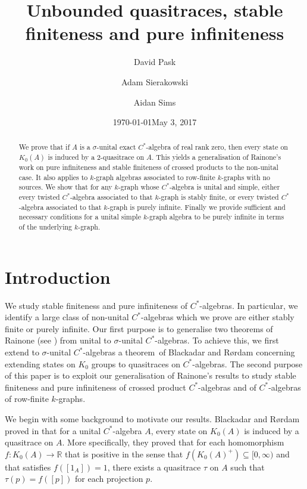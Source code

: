 \documentclass[a4paper, 12pt]{amsart}
\date{\today}
\author{David Pask}
\author{Adam Sierakowski}
\author{Aidan Sims}
\title[Quasitraces]{Unbounded quasitraces, stable finiteness and pure infiniteness}
\date{May 3, 2017}
\numberwithin{equation}{section}
\newcounter{theorem}
\theoremstyle{remark}
\theoremstyle{definition}
\begin{document}
\begin{abstract}
We prove that if $A$ is a $\sigma$-unital exact $C^*$-algebra of real rank zero, then
every state on $K_0(A)$ is induced by a 2-quasitrace on $A$. This yields a generalisation
of Rainone's work on pure infiniteness and stable finiteness of crossed products to the
non-unital case. It also applies to $k$-graph algebras associated to row-finite
$k$-graphs with no sources. We show that for any $k$-graph whose $C^*$-algebra is unital
and simple, either every twisted $C^*$-algebra associated to that $k$-graph is stably
finite, or every twisted $C^*$-algebra associated to that $k$-graph is purely infinite.
Finally we provide sufficient and necessary conditions for a unital simple $k$-graph
algebra to be purely infinite in terms of the underlying $k$-graph.
\end{abstract}

\maketitle

\tableofcontents

\section*{Introduction}
We study stable finiteness and pure infiniteness of $C^*$-algebras. In particular, we
identify a large class of non-unital $C^*$-algebras which we prove are either stably
finite or purely infinite. Our first purpose is to generalise two theorems of Rainone
(see \cite[Theorem~1.1, Theorem~1.2]{Rai}) from unital to $\sigma$-unital $C^*$-algebras.
To achieve this, we first extend to $\sigma$-unital $C^*$-algebras a theorem~of Blackadar
and R{\o}rdam \cite{MR1190414} concerning extending states on $K_0$ groups to quasitraces
on $C^*$-algebras. The second purpose of this paper is to exploit our generalisation of
Rainone's results to study stable finiteness and pure infiniteness of crossed product
$C^*$-algebras and of $C^*$-algebras of row-finite $k$-graphs.

We begin with some background to motivate our results. Blackadar and R{\o}rdam proved in
\cite{MR1190414} that for a unital $C^*$-algebra $A$, every state on $K_0(A)$ is induced
by a quasitrace on $A$. More specifically, they proved that for each homomorphism
$f\colon K_0(A)\to {\mathbb{R}}$ that is positive in the sense that $f(K_0(A)^+)\subseteq
[0,\infty)$ and that satisfies $f([1_A]) = 1$, there exists a quasitrace $\tau$ on $A$
such that $\tau(p) = f([p])$ for each projection $p$.
\end{document}
